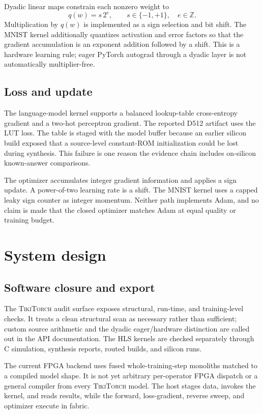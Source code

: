 \documentclass[10pt]{article}
\newcommand{\tikitorch}{\textsc{TikiTorch}}
\begin{document}
Dyadic linear maps constrain each nonzero weight to
\begin{equation}
  q(w) = s\,2^e, \qquad s\in\{-1,+1\},\quad e\in\mathbb{Z}.
\end{equation}
Multiplication by $q(w)$ is implemented as a sign selection and bit shift.
The MNIST kernel additionally quantizes activation and error factors so that
the gradient accumulation is an exponent addition followed by a shift.  This
is a hardware learning rule; eager PyTorch autograd through a dyadic layer is
not automatically multiplier-free.

\subsection{Loss and update}

The language-model kernel supports a balanced lookup-table cross-entropy
gradient and a two-hot perceptron gradient.  The reported D512 artifact uses
the LUT loss.  The table is staged with the model buffer because an earlier
silicon build exposed that a source-level constant-ROM initialization could be
lost during synthesis.  This failure is one reason the evidence chain includes
on-silicon known-answer comparisons.

The optimizer accumulates integer gradient information and applies a sign
update.  A power-of-two learning rate is a shift.  The MNIST kernel uses a
capped leaky sign counter as integer momentum.  Neither path implements Adam,
and no claim is made that the closed optimizer matches Adam at equal quality or
training budget.

\section{System design}

\subsection{Software closure and export}

The \tikitorch{} audit surface exposes structural, run-time, and training-level
checks.  It treats a clean structural scan as necessary rather than sufficient;
custom source arithmetic and the dyadic eager/hardware distinction are called
out in the API documentation.  The HLS kernels are checked separately through
C simulation, synthesis reports, routed builds, and silicon runs.

The current FPGA backend uses fused whole-training-step monoliths matched to a
compiled model shape.  It is not yet arbitrary per-operator FPGA dispatch or a
general compiler from every \tikitorch{} model.  The host stages data, invokes
the kernel, and reads results, while the forward, loss-gradient, reverse sweep,
and optimizer execute in fabric.
\end{document}
